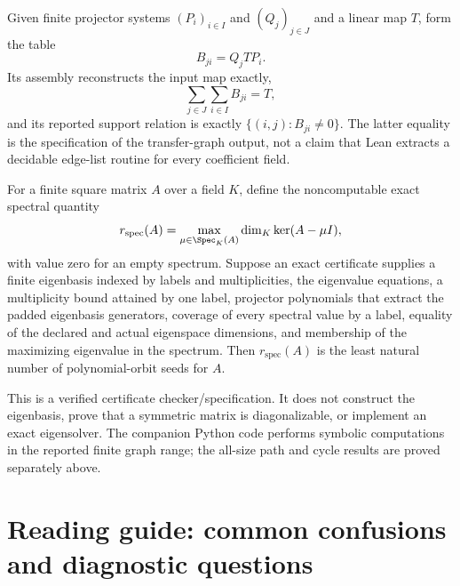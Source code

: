 \begin{construction}
\label{con:transfer-block-algorithm}
Given finite projector systems $(P_i)_{i\in I}$ and $(Q_j)_{j\in J}$ and a
linear map $T$, form the table
\[
B_{ji}=Q_jTP_i.
\]
Its assembly reconstructs the input map exactly,
\[
\sum_{j\in J}\sum_{i\in I}B_{ji}=T,
\]
and its reported support relation is exactly
$\{(i,j):B_{ji}\ne0\}$.  The latter equality is the specification of the
transfer-graph output, not a claim that Lean extracts a decidable edge-list
routine for every coefficient field.
\end{construction}

\begin{construction}
\label{con:exact-graph-seed-rank}
For a finite square matrix $A$ over a field $K$, define the noncomputable exact
spectral quantity
\[
r_{\mathrm{spec}}(A)
=
\max_{\mu\in\Spec_K(A)}
\dim_K\ker(A-\mu I),
\]
with value zero for an empty spectrum.  Suppose an exact certificate supplies
a finite eigenbasis indexed by labels and multiplicities, the eigenvalue
equations, a multiplicity bound attained by one label, projector polynomials
that extract the padded eigenbasis generators, coverage of every spectral
value by a label, equality of the declared and actual eigenspace dimensions,
and membership of the maximizing eigenvalue in the spectrum.  Then
$r_{\mathrm{spec}}(A)$ is the least natural number of polynomial-orbit seeds
for $A$.

This is a verified certificate checker/specification.  It does not construct
the eigenbasis, prove that a symmetric matrix is diagonalizable, or implement
an exact eigensolver.  The companion Python code performs symbolic
computations in the reported finite graph range; the all-size path and cycle
results are proved separately above.
\end{construction}


\section{Reading guide: common confusions and diagnostic questions}

